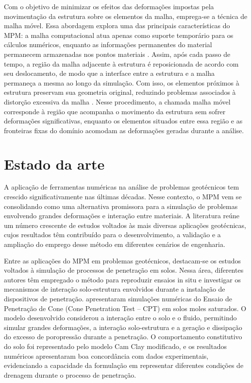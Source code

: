 Com o objetivo de minimizar os efeitos das deformações impostas pela movimentação da estrutura sobre os elementos da malha, emprega-se a técnica de malha móvel. Essa abordagem explora uma das principais características do MPM: a malha computacional atua apenas como suporte temporário para os cálculos numéricos, enquanto as informações permanentes do material permanecem armazenadas nos pontos materiais \cite{Ceccato2022}. Assim, após cada passo de tempo, a região da malha adjacente à estrutura é reposicionada de acordo com seu deslocamento, de modo que a interface entre a estrutura e a malha permaneça a mesma ao longo da simulação. Com isso, os elementos próximos à estrutura preservam sua geometria original, reduzindo problemas associados à distorção excessiva da malha \cite{Ceccato2017}. Nesse procedimento, a chamada malha móvel corresponde à região que acompanha o movimento da estrutura sem sofrer deformações significativas, enquanto os elementos situados entre essa região e as fronteiras fixas do domínio acomodam as deformações geradas durante a análise.



\section{Estado da arte}

A aplicação de ferramentas numéricas na análise de problemas geotécnicos tem crescido significativamente nas últimas décadas. Nesse contexto, o MPM vem se consolidando como uma alternativa promissora para a simulação de problemas envolvendo grandes deformações e interação entre materiais. A literatura reúne um número crescente de estudos voltados às mais diversas aplicações geotécnicas, cujos resultados têm contribuído para o desenvolvimento, a validação e a ampliação do emprego desse método em diferentes cenários de engenharia. 

Entre as aplicações do MPM em problemas geotécnicos, destacam-se os estudos voltados à simulação de processos de penetração em solos. Nessa área, diferentes autores têm empregado o método para reproduzir ensaios in situ e investigar os mecanismos de interação solo-estrutura envolvidos durante a instalação de dispositivos de penetração.  apresentaram simulações numéricas do Ensaio de Penetração de Cone (Cone Penetration Test – CPT) em solos moles saturados. O modelo desenvolvido considerou a interação entre o solo e o fluido, permitindo simular grandes deformações, a interação solo-estrutura e a geração e dissipação do excesso de poropressão durante a penetração. O comportamento constitutivo do solo foi representado pelo modelo Cam Clay modificado, e os resultados numéricos apresentaram boa concordância com dados experimentais, evidenciando a capacidade da formulação em representar diferentes condições de drenagem durante o processo de penetração.

